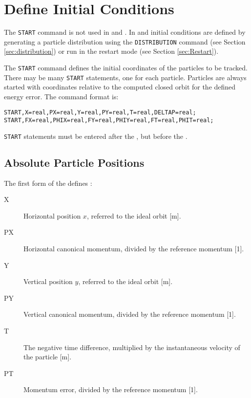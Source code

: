 \section{Define Initial Conditions}
\label{sec:trackstart}
The \texttt{START} command is not used in \noopalt and \noopalcycl . In 
\opalt and \opalcycl initial conditions are defined by generating a particle
distribution using the \texttt{DISTRIBUTION} command (see Section \ref{sec:distribution}) or
run \opal in the restart mode (see Section \ref{sec:Restart}). 

The \texttt{START} command defines the initial coordinates of
the particles to be tracked.
There may be many \texttt{START} statements, one for each particle.
Particles are always started with coordinates relative
to the computed closed orbit for the defined energy error.
The command format is:
\begin{verbatim}
START,X=real,PX=real,Y=real,PY=real,T=real,DELTAP=real;
START,FX=real,PHIX=real,FY=real,PHIY=real,FT=real,PHIT=real;
\end{verbatim}
\texttt{START} statements must be entered after the
,
but before the .

\subsection{Absolute Particle Positions}
The first form of the  defines 
:
\begin{description}
\item[X]
  Horizontal position $x$, referred to the ideal orbit [m].
\item[PX]
  Horizontal canonical momentum, divided by the reference momentum [1].
\item[Y]
  Vertical position $y$, referred to the ideal orbit [m].
\item[PY]
  Vertical canonical momentum, divided by the reference momentum [1].
\item[T]
  The negative time difference, 
  multiplied by the instantaneous velocity of the particle [m].
\item[PT]
  Momentum error, divided by the reference momentum [1].
\end{description}


